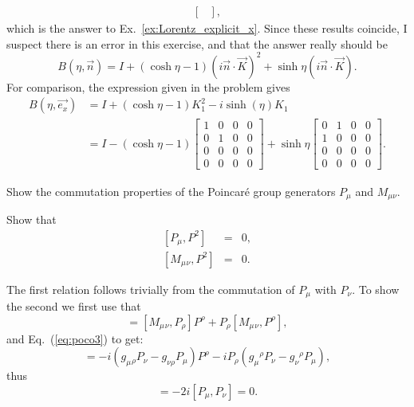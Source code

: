 \documentclass[notes.tex]{subfiles}
\begin{document}
\begin{Answer}
\begin{align*}
\begin{bmatrix}
    \end{bmatrix},
\end{align*}
which is the answer to Ex.~\ref{ex:Lorentz_explicit_x}. Since these results coincide, I suspect there is an error in this exercise, and that the answer really should be
\begin{equation*}
    B(\eta,\vec{n}) = I + (\cosh\eta-1)(i\vec{n}\cdot\vec{K})^2+\sinh\eta (i\vec{n}\cdot\vec{K}).
\end{equation*}
For comparison, the expression given in the problem gives
\begin{align*}
    B(\eta,\vec{e_x}) &= I+(\cosh\eta-1) K_1^2-i\sinh(\eta) K_1
    \\
    &= I - (\cosh\eta-1)\begin{bmatrix}
        1&0&0&0 \\ 0&1&0&0 \\ 0&0&0&0 \\ 0&0&0&0
    \end{bmatrix} +\sinh\eta \begin{bmatrix}
        0&1&0&0 \\ 1&0&0&0 \\ 0&0&0&0 \\ 0&0&0&0
    \end{bmatrix}.
\end{align*}
\end{Answer}


\begin{Exercise}[]
Show the commutation properties of the Poincaré group generators $P_\mu$ and $M_{\mu\nu}$.
\end{Exercise}

\begin{Exercise}[]
Show that
\begin{eqnarray*}
\left[P_\mu, P^2\right] &=& 0,\\
\left[M_\mu{}_{\nu}, P^2\right]& =& 0.
\end{eqnarray*}
\end{Exercise}

\begin{Answer} 
The first relation follows trivially from the commutation of $P_\mu$ with $P_\nu$. To show the second
we first use that
\begin{equation*}
[M_\mu{}_\nu, P_\rho P^\rho] = [M_\mu{}_\nu, P_\rho] P^\rho  + P_\rho [M_\mu{}_\nu,  P^\rho],
\end{equation*}
and Eq.~(\ref{eq:poco3}) to get:
\begin{equation*}
[M_\mu{}_\nu, P_\rho P^\rho] = -i(g_\mu{}_\rho P_\nu - g_{\nu \rho} P_\mu) P^\rho  - iP_\rho (g_\mu{}^\rho P_\nu - g_{\nu}{}^{ \rho} P_\mu),
\end{equation*}
thus
\begin{equation*}
[M_\mu{}_\nu, P_\rho P^\rho] = -2i[P_\mu, P_\nu] = 0.
\end{equation*}
\end{Answer}
\end{document}
